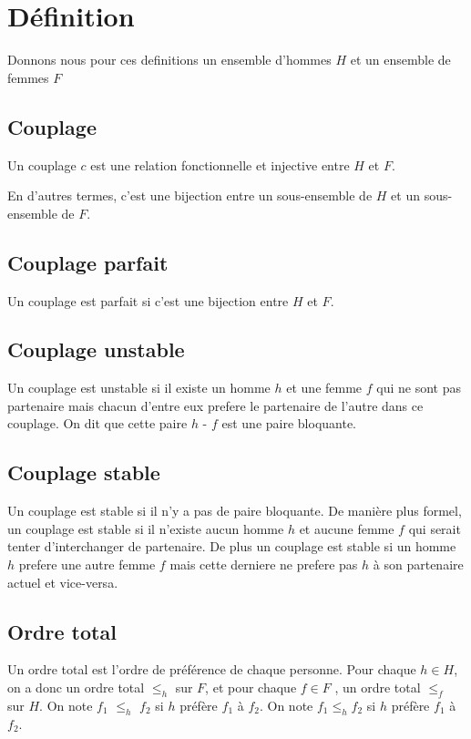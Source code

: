 \documentclass[11pt]{article}
\begin{document}
\section{D\'efinition}

Donnons nous pour ces definitions un ensemble d'hommes $H$ et un ensemble
de femmes $F$

\subsection{Couplage}
Un couplage $c$ est une relation fonctionnelle et injective entre $H$ et $F$.

En d’autres termes, c'est une bijection entre un sous-ensemble de $H$ et un
sous-ensemble de $F$.

\subsection{Couplage parfait}
Un couplage est parfait si c’est une bijection entre $H$ et $F$.


\subsection{Couplage unstable}
Un couplage est unstable si il existe un homme $h$ et une femme $f$ qui ne sont
pas partenaire mais chacun d'entre eux prefere le partenaire de l'autre dans ce
couplage. On dit que cette paire $h$ - $f$ est une paire bloquante.

\subsection{Couplage stable}
Un couplage est stable si il n'y a pas de paire bloquante. De mani\`ere plus
formel, un couplage est stable si il n'existe aucun homme $h$ et aucune femme
$f$ qui serait tenter d'interchanger de partenaire.
De plus un couplage est stable si un homme $h$ prefere une autre femme $f$ mais
cette derniere ne prefere pas $h$ \`a son partenaire actuel et vice-versa.

\subsection{Ordre total}
Un ordre total est l'ordre de pr\'ef\'erence de chaque personne.
Pour chaque $h \in H$, on a donc un ordre total $\leq_h$ sur $F$, et pour
chaque $f \in F$ , un ordre total $\leq_f$ sur $H$.
On note $f_1$ $\leq_h$ $f_2$ si $h$ pr\'ef\`ere $f_1$ \`a $f_2$.
On note $f_1 \leq_h f_2$ si $h$ pr\'ef\`ere $f_1$ \`a $f_2$.
\end{document}
